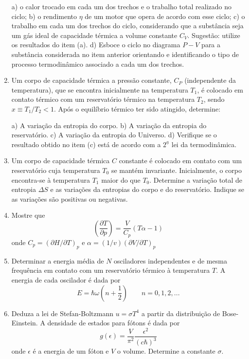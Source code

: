 \begin{enumerate}[start=1,label={\bfseries Q\arabic*.}]
a) o calor trocado em cada um dos trechos e o trabalho total realizado no ciclo;
b) o rendimento $\eta$ de um motor que opera de acordo com esse ciclo;
c) o trabalho em cada um dos trechos do ciclo, considerando que a substância seja um gás ideal de capacidade térmica a volume constante $C_{V}$. Sugestão: utilize os resultados do item (a).
d) Esboce o ciclo no diagrama $P-V$ para a substância considerada no item anterior orientando e identificando o tipo de processo termodinâmico associado a cada um dos trechos.




\item Um corpo de capacidade térmica a pressão constante, $C_{P}$ (independente da temperatura), que se encontra inicialmente na temperatura $T_{1}$, é colocado em contato térmico com um reservatório térmico na temperatura $T_{2}$, sendo $x \equiv T_{1}/T_{2} < 1$. Após o equilíbrio térmico ter sido atingido, determine:

a) A variação da entropia do corpo.
b) A variação da entropia do reservatório.
c) A variação da entropia do Universo.
d) Verifique se o resultado obtido no item (c) está de acordo com a $2^{\underline{a}}$ lei da termodinâmica.



\item Um corpo de capacidade térmica $C$ constante é colocado em contato com um reservatório cuja temperatura $T_{0}$ se mantém invariante. Inicialmente, o corpo encontra-se à temperatura $T_{1}$ maior do que $T_{0}$. Determine a variação total de entropia $\Delta S$ e as variações da entropias do corpo e do reservatório. Indique se as variações são positivas ou negativas.


\item Mostre que
$$
\left( \frac{\partial T}{\partial p}  \right) = \frac{V}{C_{p}} (T\alpha - 1)
$$
onde $C_{p} = (\partial H/ \partial T)_{p}$ e $\alpha = (1/v) (\partial V/ \partial T)_{p}$


\item Determinar a energia média de $N$ osciladores independentes e de mesma frequência em contato com um reservatório térmico à temperatura $T$. A energia de cada oscilador é dada por
$$
E = \hbar \omega \left(  n + \frac{1}{2}  \right) \quad \quad n = 0,1,2,...
$$



\item Deduza a lei de Stefan-Boltzmann $u = \sigma T^{4}$ a partir da distribuição de Bose-Einstein. A densidade de estados para fótons é dada por
$$
g(\epsilon) = \frac{V}{\pi^{2}} \frac{\epsilon^{2}}{(c \hbar)^{3}}
$$
onde $\epsilon$ é a energia de um fóton e $V$ o volume. Determine a constante $\sigma$.





\end{enumerate}
